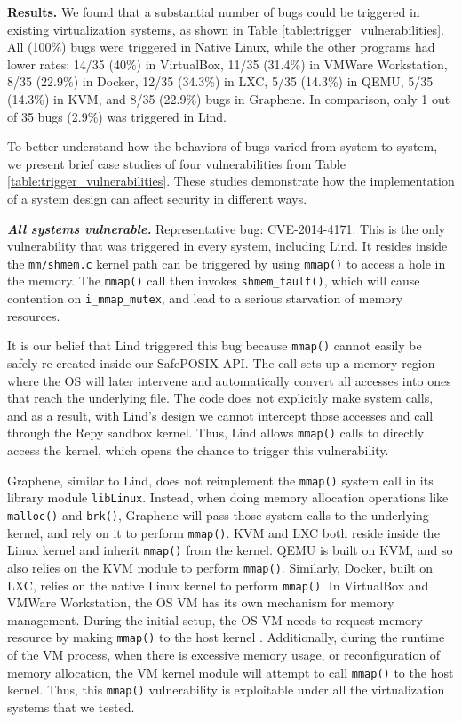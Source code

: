 {{\noindent
\textbf{Results.}
We found that a substantial number of bugs could be triggered in existing
virtualization systems, as shown in Table \ref{table:trigger_vulnerabilities}.
All (100\%) bugs were triggered in Native Linux,
while the other programs had lower rates: 14/35 (40\%) in
VirtualBox,
11/35 (31.4\%)  in VMWare Workstation, 8/35 (22.9\%)  in Docker,
12/35 (34.3\%)  in LXC, 5/35 (14.3\%)  in QEMU, 5/35 (14.3\%)  in KVM,
and 8/35 (22.9\%) bugs in Graphene.
In comparison, only 1 out of 35 bugs  (2.9\%) was triggered in Lind.

To better understand how the behaviors of bugs varied
from system to system, we present brief case studies of four
vulnerabilities from Table \ref{table:trigger_vulnerabilities}.
These
studies demonstrate how the implementation of a system design can
affect security in different ways.

\emph{\textbf{All systems vulnerable.}}  Representative bug: CVE-2014-4171.
This is the only vulnerability that was triggered in every
system, including Lind. It resides inside the \texttt{mm/shmem.c} kernel
path \lois{Per Yanyan: Is this a [popular path?}
can be triggered by using \texttt{mmap()} to access a hole in the memory.
The \texttt{mmap()} call then invokes \texttt{shmem\_fault()}, which will cause contention
on \texttt{i\_mmap\_mutex}, and lead to a serious starvation of memory resources.

It is our belief that Lind triggered this bug because \texttt{mmap()} cannot easily
be safely re-created inside our SafePOSIX API. The call sets up a
memory region where the OS will later
intervene and automatically convert all accesses into ones that reach the
underlying file.  The code does not explicitly make system calls, and as
a result, with Lind's design we cannot intercept those accesses and call through
the Repy sandbox kernel. Thus,
Lind allows \texttt{mmap()} calls to directly access the kernel, which
opens the chance to trigger this vulnerability.

Graphene, similar to Lind, does not reimplement the
\texttt{mmap()} system call in its library module \texttt{libLinux}.  Instead, when doing
memory allocation operations like \texttt{malloc()} and \texttt{brk()}, Graphene will
pass those system calls to the underlying kernel, and rely on it to
perform \texttt{mmap()}.
KVM and LXC both reside inside the Linux kernel and inherit \texttt{mmap()}
from the kernel. QEMU is built on KVM, and so also relies on the KVM module to perform
\texttt{mmap()}. Similarly, Docker, built on LXC, relies on the native Linux kernel to perform
\texttt{mmap()}. In VirtualBox and VMWare Workstation, the OS VM has its own mechanism
for memory management. During the initial setup, the OS VM needs to request memory resource
by making \texttt{mmap()} to the host kernel . Additionally, during the runtime of the VM process,
when there is excessive memory usage, or reconfiguration of memory allocation, the VM kernel module
will attempt to call \texttt{mmap()} to the host kernel. Thus, this \texttt{mmap()} vulnerability
is exploitable under all the virtualization systems that we tested.

}}

